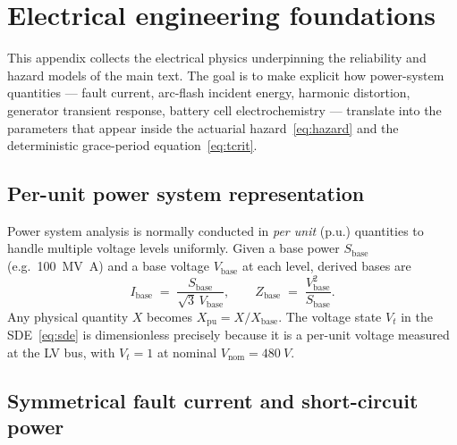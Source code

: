 
\appendix
\renewcommand{\thesection}{\Alph{section}}
\setcounter{section}{0}

\section{Electrical engineering foundations}\label{sec:eefoundations}

This appendix collects the electrical physics underpinning the
reliability and hazard models of the main text. The goal is to make
explicit how power-system quantities — fault current, arc-flash
incident energy, harmonic distortion, generator transient response,
battery cell electrochemistry — translate into the parameters that
appear inside the actuarial hazard~\eqref{eq:hazard} and the
deterministic grace-period equation~\eqref{eq:tcrit}.

\subsection{Per-unit power system representation}\label{ss:pu}

Power system analysis is normally conducted in \emph{per unit} (p.u.)
quantities to handle multiple voltage levels uniformly. Given a base
power $S_{\mathrm{base}}$ (e.g.\ \SI{100}{\mega\volt\ampere}) and a
base voltage $V_{\mathrm{base}}$ at each level, derived bases are
\begin{equation}\label{eq:pu-bases}
   I_{\mathrm{base}} \;=\; \frac{S_{\mathrm{base}}}{\sqrt{3}\,V_{\mathrm{base}}},
   \qquad
   Z_{\mathrm{base}} \;=\; \frac{V_{\mathrm{base}}^2}{S_{\mathrm{base}}}.
\end{equation}
Any physical quantity $X$ becomes $X_{\mathrm{pu}}=X/X_{\mathrm{base}}$.
The voltage state $V_t$ in the SDE~\eqref{eq:sde} is dimensionless
precisely because it is a per-unit voltage measured at the LV bus, with
$V_t=1$ at nominal $V_{\mathrm{nom}}=\SI{480}{V}$.

\subsection{Symmetrical fault current and short-circuit power}\label{ss:fault}

